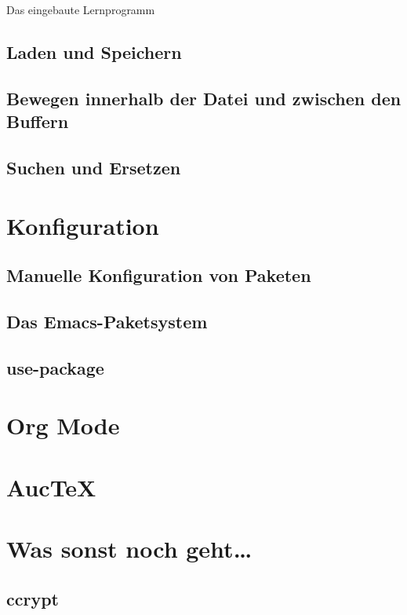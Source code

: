 \documentclass[12pt,ngerman]{scrbook}
\begin{document}
Das eingebaute Lernprogramm

\section{Laden und Speichern}

\section{Bewegen innerhalb der Datei und zwischen den Buffern}

\section{Suchen und Ersetzen}

\chapter{Konfiguration}

\section{Manuelle Konfiguration von Paketen}

\section{Das Emacs-Paketsystem}

\section{use-package}

\chapter{Org Mode}

\chapter{Auc\TeX}


\chapter{Was sonst noch geht\ldots}

\section{ccrypt}
\end{document}
